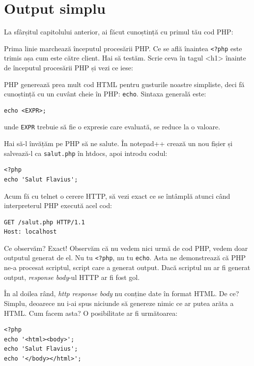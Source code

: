 \section{Output simplu}
\label{sec:output simplu}
La sfârșitul capitolului anterior, ai făcut cunoștință
cu primul tău cod PHP:


Prima linie marchează începutul procesării PHP. Ce se află
înaintea \texttt{<?php} este trimis așa cum este către client.
Hai să testăm. Scrie ceva în tagul <h1> înainte de începutul
procesării PHP și vezi ce iese:


PHP generează prea mult cod HTML pentru gusturile noastre simpliste, deci
fă cunoștință cu un cuvânt cheie în PHP: \texttt{echo}. Sintaxa
generală este:
\begin{verbatim}
echo <EXPR>;
\end{verbatim}
unde \texttt{EXPR}  trebuie să fie o expresie care evaluată, se reduce la o valoare.


Hai să-l învățăm pe PHP să ne salute. În notepad++ crează un nou fișier
și salvează-l ca \texttt{salut.php} în htdocs, apoi introdu codul:
\begin{lstlisting}
<?php
echo 'Salut Flavius';
\end{lstlisting}
Acum fă cu telnet o cerere HTTP, să vezi exact ce se întâmplă atunci când
interpreterul PHP execută acel cod:
\begin{verbatim}
GET /salut.php HTTP/1.1
Host: localhost
\end{verbatim}

Ce observăm? Exact! Observăm că nu vedem nici urmă de cod PHP, vedem doar
outputul generat de el. Nu tu \texttt{<?php}, nu tu \texttt{echo}. Asta
ne demonstrează că PHP ne-a procesat scriptul, script care a generat
output. Dacă scriptul nu ar fi generat output, \textit{response body}-ul
HTTP ar fi fost gol.

În al doilea rând, \textsl{http response body} nu conține date în format HTML.
De ce? Simplu, deoarece nu i-ai spus niciunde să genereze nimic ce ar putea arăta a
HTML. Cum facem asta? O posibilitate ar fi următoarea:
\begin{lstlisting}
<?php
echo '<html><body>';
echo 'Salut Flavius';
echo '</body></html>';
\end{lstlisting}


